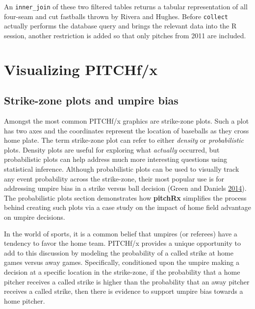 \documentclass[12pt,]{isuthesis}
\newenvironment{Shaded}{\begin{snugshade}}{\end{snugshade}}
\newcommand{\KeywordTok}[1]{\textcolor[rgb]{0.13,0.29,0.53}{\textbf{{#1}}}}
\newcommand{\StringTok}[1]{\textcolor[rgb]{0.31,0.60,0.02}{{#1}}}
\newcommand{\NormalTok}[1]{{#1}}
\begin{document}
An \texttt{inner\_join} of these two filtered tables returns a tabular
representation of all four-seam and cut fastballs thrown by Rivera and
Hughes. Before \texttt{collect} actually performs the database query and
brings the relevant data into the R session, another restriction is
added so that only pitches from 2011 are included.

\begin{Shaded}
\end{Shaded}

\section{Visualizing PITCHf/x}\label{visualizing-pitchfx}

\subsection{Strike-zone plots and umpire
bias}\label{strike-zone-plots-and-umpire-bias}

Amongst the most common PITCHf/x graphics are strike-zone plots. Such a
plot has two axes and the coordinates represent the location of
baseballs as they cross home plate. The term strike-zone plot can refer
to either \emph{density} or \emph{probabilistic} plots. Density plots
are useful for exploring what \emph{actually} occurred, but
probabilistic plots can help address much more interesting questions
using statistical inference. Although probabilistic plots can be used to
visually track any event probability across the strike-zone, their most
popular use is for addressing umpire bias in a strike versus ball
decision (Green and Daniels \protect\hyperlink{ref-bias}{2014}). The
probabilistic plots section demonstrates how \textbf{pitchRx} simplifies
the process behind creating such plots via a case study on the impact of
home field advantage on umpire decisions.

In the world of sports, it is a common belief that umpires (or referees)
have a tendency to favor the home team. PITCHf/x provides a unique
opportunity to add to this discussion by modeling the probability of a
called strike at home games versus away games. Specifically, conditioned
upon the umpire making a decision at a specific location in the
strike-zone, if the probability that a home pitcher receives a called
strike is higher than the probability that an away pitcher receives a
called strike, then there is evidence to support umpire bias towards a
home pitcher.
\end{document}
